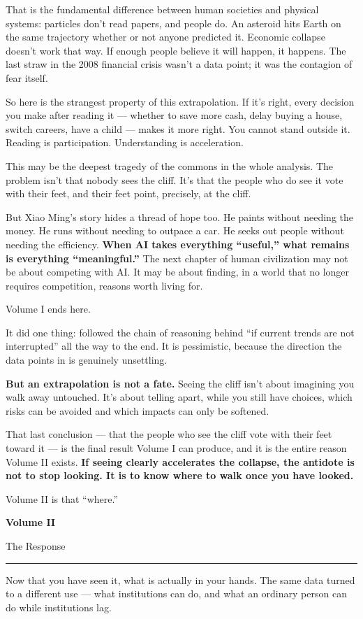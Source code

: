 \documentclass[11pt,a4paper]{article}
\newcommand{\volumepage}[3]{%
  \clearpage
  \thispagestyle{empty}
  \vspace*{0.32\textheight}
  \begin{center}
    {\Huge\bfseries #1\par}
    \vspace{0.9em}
    {\Large\color{subtitlecolor} #2\par}
    \vspace{1.6em}
    \rule{0.34\textwidth}{0.6pt}\par
    \vspace{1.6em}
    \begin{minipage}{0.74\textwidth}
      \centering\large\color{subtitlecolor} #3
    \end{minipage}
  \end{center}
  \clearpage
  \phantomsection
  \addcontentsline{toc}{section}{\protect\textbf{#1\ \textperiodcentered\ #2}}
}
\begin{document}
That is the fundamental difference between human societies and physical systems: particles don't read papers, and people do. An asteroid hits Earth on the same trajectory whether or not anyone predicted it. Economic collapse doesn't work that way. If enough people believe it will happen, it happens. The last straw in the 2008 financial crisis wasn't a data point; it was the contagion of fear itself.

So here is the strangest property of this extrapolation. If it's right, every decision you make after reading it --- whether to save more cash, delay buying a house, switch careers, have a child --- makes it more right. You cannot stand outside it. Reading is participation. Understanding is acceleration.

This may be the deepest tragedy of the commons in the whole analysis. The problem isn't that nobody sees the cliff. It's that the people who do see it vote with their feet, and their feet point, precisely, at the cliff.

But Xiao Ming's story hides a thread of hope too. He paints without needing the money. He runs without needing to outpace a car. He seeks out people without needing the efficiency. \textbf{When AI takes everything ``useful,'' what remains is everything ``meaningful.''} The next chapter of human civilization may not be about competing with AI. It may be about finding, in a world that no longer requires competition, reasons worth living for.

Volume I ends here.

It did one thing: followed the chain of reasoning behind ``if current trends are not interrupted'' all the way to the end. It is pessimistic, because the direction the data points in is genuinely unsettling.

\textbf{But an extrapolation is not a fate.} Seeing the cliff isn't about imagining you walk away untouched. It's about telling apart, while you still have choices, which risks can be avoided and which impacts can only be softened.

That last conclusion --- that the people who see the cliff vote with their feet toward it --- is the final result Volume I can produce, and it is the entire reason Volume II exists. \textbf{If seeing clearly accelerates the collapse, the antidote is not to stop looking. It is to know where to walk once you have looked.}

Volume II is that ``where.''

\volumepage{Volume II}{The Response}{Now that you have seen it, what is actually in your hands. The same data turned to a different use --- what institutions can do, and what an ordinary person can do while institutions lag.}
\end{document}
